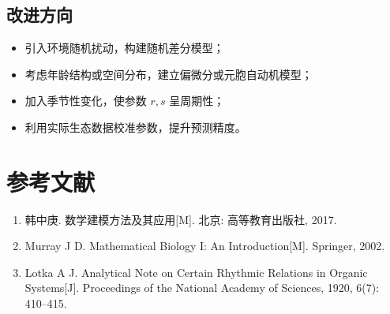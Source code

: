 \documentclass[12pt]{ctexart}
\begin{document}
\subsection{改进方向}
\begin{itemize}
    \item 引入环境随机扰动，构建随机差分模型；
    \item 考虑年龄结构或空间分布，建立偏微分或元胞自动机模型；
    \item 加入季节性变化，使参数 $r, s$ 呈周期性；
    \item 利用实际生态数据校准参数，提升预测精度。
\end{itemize}

\section*{参考文献}
\begin{enumerate}
    \item 韩中庚. 数学建模方法及其应用[M]. 北京: 高等教育出版社, 2017.
    \item Murray J D. Mathematical Biology I: An Introduction[M]. Springer, 2002.
    \item Lotka A J. Analytical Note on Certain Rhythmic Relations in Organic Systems[J]. Proceedings of the National Academy of Sciences, 1920, 6(7): 410–415.
\end{enumerate}

\appendix
\end{document}
